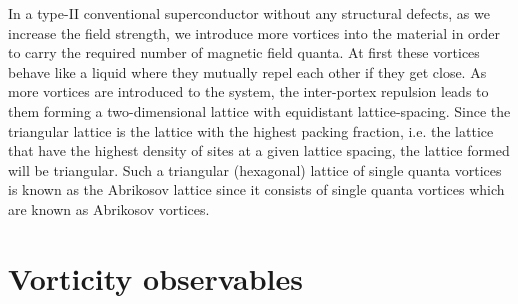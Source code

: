 In a type-II conventional superconductor without any structural defects, as we increase the field strength, we introduce more vortices into the material
in order to carry the required number of magnetic field quanta. At first these vortices behave like a liquid where they mutually repel each other if they 
get close. As more vortices are introduced to the system, the inter-portex repulsion leads to them forming a two-dimensional lattice with equidistant lattice-spacing.
Since the triangular lattice is the lattice with the highest packing fraction, i.e. the lattice that have the highest density of sites at a given lattice spacing,
the lattice formed will be triangular. Such a triangular (hexagonal) lattice of single quanta vortices is known as the Abrikosov lattice since it consists
of single quanta vortices which are known as Abrikosov vortices.

\section{Vorticity observables}
\label{sec:Vor:Obs}


